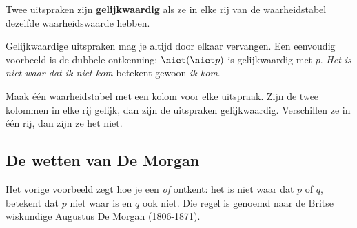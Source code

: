 \begin{theorie}
Twee uitspraken zijn \textbf{\textcolor{accent}{gelijkwaardig}} als ze in elke rij van de waarheidstabel dezelfde waarheidswaarde hebben.
\end{theorie}

Gelijkwaardige uitspraken mag je altijd door elkaar vervangen. Een eenvoudig voorbeeld is de dubbele ontkenning: $\niet(\niet p)$ is gelijkwaardig met $p$. \textit{Het is niet waar dat ik niet kom} betekent gewoon \textit{ik kom}.


\begin{werkwijze}
Maak één waarheidstabel met een kolom voor elke uitspraak. Zijn de twee kolommen in elke rij gelijk, dan zijn de uitspraken gelijkwaardig. Verschillen ze in één rij, dan zijn ze het niet.
\end{werkwijze}

\begin{oefeningen}
\end{oefeningen}

\subsection{De wetten van De Morgan}

Het vorige voorbeeld zegt hoe je een \textit{of} ontkent: het is niet waar dat $p$ of $q$, betekent dat $p$ niet waar is en $q$ ook niet. Die regel is genoemd naar de Britse wiskundige Augustus De Morgan (1806-1871).

